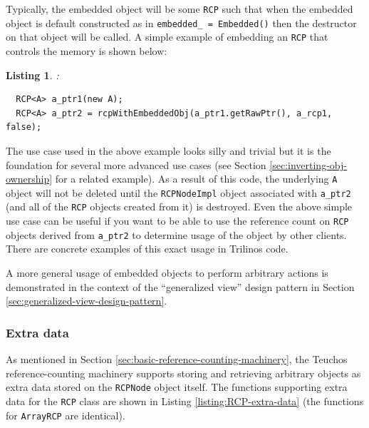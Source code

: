 \documentclass[pdf,ps2pdf,11pt]{SANDreport}
\newtheorem{listing}{Listing}
\begin{document}
Typically, the embedded object will be some {}\texttt{RCP} such that
when the embedded object is default constructed as in
{}\texttt{embedded\_ = Embedded()} then the destructor on that object
will be called.  A simple example of embedding an {}\texttt{RCP} that
controls the memory is shown below:

\begin{listing}: \\
{\small\begin{verbatim}
  RCP<A> a_ptr1(new A);
  RCP<A> a_ptr2 = rcpWithEmbeddedObj(a_ptr1.getRawPtr(), a_rcp1, false);
\end{verbatim}}
\end{listing}

The use case used in the above example looks silly and trivial but it
is the foundation for several more advanced use cases (see Section
{}\ref{sec:inverting-obj-ownership} for a related example).  As a
result of this code, the underlying {}\texttt{A} object will not be
deleted until the {}\texttt{RCPNodeImpl} object associated with
{}\texttt{a\_ptr2} (and all of the {}\texttt{RCP} objects created from
it) is destroyed.  Even the above simple use case can be useful if you
want to be able to use the reference count on {}\texttt{RCP} objects
derived from {}\texttt{a\_ptr2} to determine usage of the object by
other clients.  There are concrete examples of this exact usage in
Trilinos code.

A more general usage of embedded objects to perform arbitrary actions
is demonstrated in the context of the ``generalized view'' design
pattern in Section {}\ref{sec:generalized-view-design-pattern}.


%
{}\subsubsection{Extra data}
\label{sec:extra-data}
%

As mentioned in Section
{}\ref{sec:basic-reference-counting-machinery}, the Teuchos
reference-counting machinery supports storing and retrieving arbitrary
objects as extra data stored on the {}\texttt{RCPNode} object itself.
The functions supporting extra data for the {}\texttt{RCP} class are
shown in Listing {}\ref{listing:RCP-extra-data} (the functions for
{}\texttt{ArrayRCP} are identical).
\end{document}
